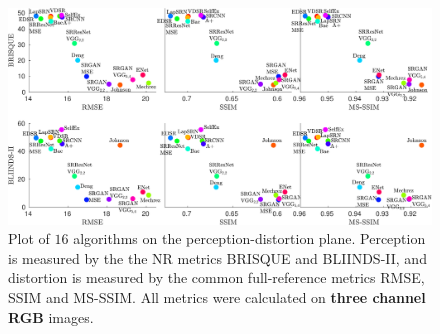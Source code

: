 \begin{figure}
	\begin{center}
		\includegraphics[width=\linewidth]{supp_figures/BRISQUE_BLIINDS_RGB.pdf}
	\end{center}
	\caption{Plot of $16$ algorithms on the perception-distortion plane. Perception is measured by the the NR metrics BRISQUE and BLIINDS-II, and distortion is measured by the common full-reference metrics RMSE, SSIM and MS-SSIM. All metrics were calculated on \textbf{three channel RGB} images.}
	\label{fig:noRefMethods7}
\end{figure}